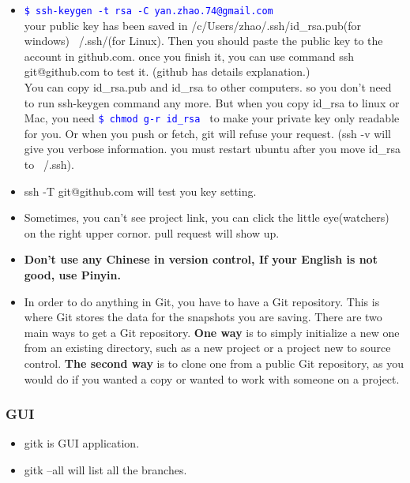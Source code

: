 \documentclass[a4paper,12pt,twoside]{book}
\newcommand{\linuxcommand}[1]{\texttt{\textcolor{blue}{\$ #1 \Pisymbol{psy}{191}}}}
\begin{document}
\begin{itemize}
\item \linuxcommand{ssh-keygen -t rsa -C yan.zhao.74@gmail.com} \\
        	your public key has been saved in /c/Users/zhao/.ssh/id\_rsa.pub(for windows) ~/.ssh/(for Linux). Then you should paste the public key to the account in github.com. once you finish it, you can use command ssh git@github.com to test it. (github has details explanation.)\\
		You can copy id\_rsa.pub and id\_rsa to other computers. so you don't need to run ssh-keygen command any more. But when you copy id\_rsa to linux or Mac, you need \linuxcommand{chmod g-r id\_rsa} to make your private key only readable for you. Or when you push or fetch, git will refuse your request.  (ssh -v will give you verbose information. you must restart ubuntu after you move id\_rsa to ~/.ssh).


         \item{ssh -T git@github.com} will test you key setting.

    \item Sometimes, you can't see project link, you can click the little eye(watchers) on the right upper cornor.
        pull request will show up.

\item \textbf{Don't use any Chinese in version control, If your English is not good, use
    Pinyin.}
\item In order to do anything in Git, you have to have a Git repository. This is where Git
    stores the data for the snapshots you are saving. There are two main ways to get a
    Git repository. \textbf{One way} is to simply initialize a new one from an existing
    directory, such as a new project or a project new to source control. \textbf{The
    second way} is to clone one from a public Git repository, as you would do if you
    wanted a copy or wanted to work with someone on a project.
\end{itemize}



\subsubsection{GUI}
    \begin{itemize}
    \item gitk is GUI application.
    \item gitk --all will list all the branches.
    \end{itemize}
\end{document}
